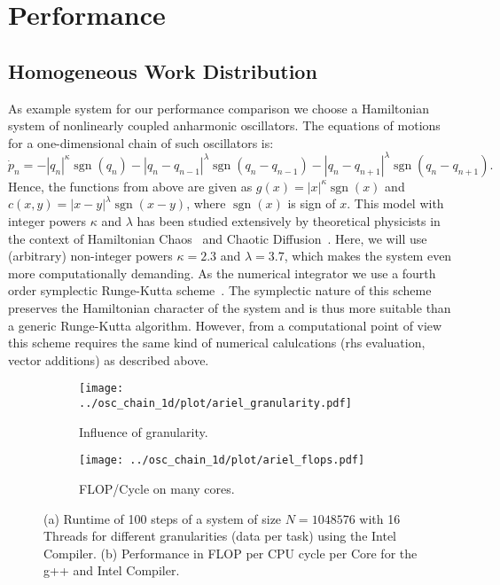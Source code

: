\documentclass[10pt]{elsarticle}
\newcommand{\sgn}{\operatorname{sgn}}
\begin{document}
\section{Performance} \label{sec:perf}

\subsection{Homogeneous Work Distribution}

As example system for our performance comparison we choose a Hamiltonian system of nonlinearly coupled anharmonic oscillators.
The equations of motions for a one-dimensional chain of such oscillators is:
\begin{equation}
 \dot p_n = -|q_n|^\kappa\sgn(q_n) - |q_n-q_{n-1}|^\lambda\sgn(q_n-q_{n-1}) - |q_n-q_{n+1}|^\lambda\sgn(q_n-q_{n+1}).
\end{equation} 
Hence, the functions from above are given as $g(x) = |x|^\kappa\sgn(x)$ and $c(x,y)=|x-y|^\lambda\sgn(x-y)$, where $\sgn(x)$ is sign of $x$.
This model with integer powers $\kappa$ and $\lambda$ has been studied extensively by theoretical physicists in the context of Hamiltonian Chaos~\cite{Mulansky-Ahnert-Pikovsky-Shepelyansky-11} and Chaotic Diffusion~\cite{Mulansky_Pikovksy_12,mulansky2013energy,Mulansky_phd_12}.
Here, we will use (arbitrary) non-integer powers $\kappa=2.3$ and $\lambda=3.7$, which makes the system even more computationally demanding.
As the numerical integrator we use a fourth order symplectic Runge-Kutta scheme~\cite{McLachlan_95}.
The symplectic nature of this scheme preserves the Hamiltonian character of the system and is thus more suitable than a generic Runge-Kutta algorithm.
However, from a computational point of view this scheme requires the same kind of numerical calulcations (rhs evaluation, vector additions) as described above.

\begin{figure}
 \begin{subfigure}[b]{0.49\textwidth}
  \centering
  \texttt{[image: ../osc\_chain\_1d/plot/ariel\_granularity.pdf]}
  \caption{Influence of granularity.}
  \label{fig:granularity_ariel_1024K}
 \end{subfigure}
 \begin{subfigure}[b]{0.49\textwidth}
  \centering
  \texttt{[image: ../osc\_chain\_1d/plot/ariel\_flops.pdf]}
  \caption{FLOP/Cycle on many cores.}
 \end{subfigure}
 \caption{(a) Runtime of 100 steps of a system of size $N=1048576$ with 16 Threads for different granularities (data per task) using the Intel Compiler. (b) Performance in FLOP per CPU cycle per Core for the g++ and Intel Compiler.} 
 \label{fig:ariel_flops}
\end{figure}
\end{document}
